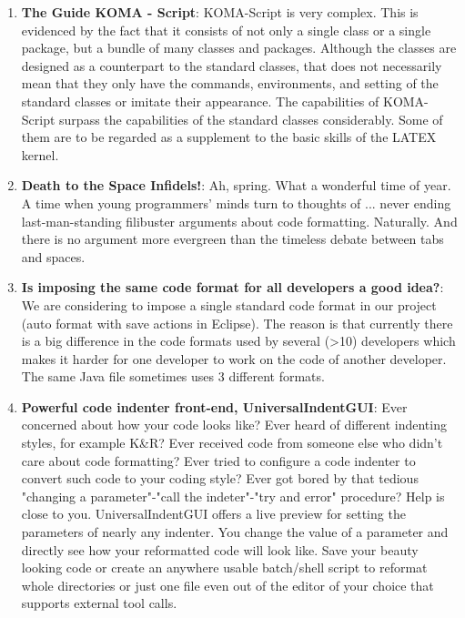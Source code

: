 \begin{englishtext}
\begin{enumerate}
    \item \textbf{The Guide KOMA - Script}: KOMA-Script  is very complex. This
    is evidenced by the fact that it consists of not only a single class or a
    single package, but a bundle of many classes and packages. Although the
    classes are designed as a counterpart to the standard classes, that does not
    necessarily mean that they only have the commands, environments, and setting
    of the standard classes or imitate their appearance. The capabilities of
    KOMA-Script surpass the capabilities of the standard classes considerably.
    Some of them are to be regarded as a supplement to the basic skills of the
    LATEX kernel. \cite{komaScrguien}

    \item \textbf{Death to the Space Infidels!}: Ah, spring. What a wonderful time of
    year. A time when young programmers' minds turn to thoughts of ... never
    ending last-man-standing filibuster arguments about code formatting.
    Naturally. And there is no argument more evergreen than the timeless debate
    between tabs and spaces. \cite{Atwood}

    \item \textbf{Is imposing the same code format for all developers a good
    idea?}: We are considering to impose a single standard code format in our
    project (auto format with save actions in Eclipse). The reason is that
    currently there is a big difference in the code formats used by several
    (>10) developers which makes it harder for one developer to work on the code
    of another developer. The same Java file sometimes uses 3 different formats.
    \cite{Geukens}

    \item \textbf{Powerful code indenter front-end, UniversalIndentGUI}: Ever
    concerned about how your code looks like? Ever heard of different indenting
    styles, for example K\&R? Ever received code from someone else who didn't
    care about code formatting? Ever tried to configure a code indenter to
    convert such code to your coding style? Ever got bored by that tedious
    "changing a parameter"-"call the indeter"-"try and error" procedure? Help is
    close to you. UniversalIndentGUI offers a live preview for setting the
    parameters of nearly any indenter. You change the value of a parameter and
    directly see how your reformatted code will look like. Save your beauty
    looking code or create an anywhere usable batch/shell script to reformat
    whole directories or just one file even out of the editor of your choice
    that supports external tool calls.


\end{enumerate}
\end{englishtext}
